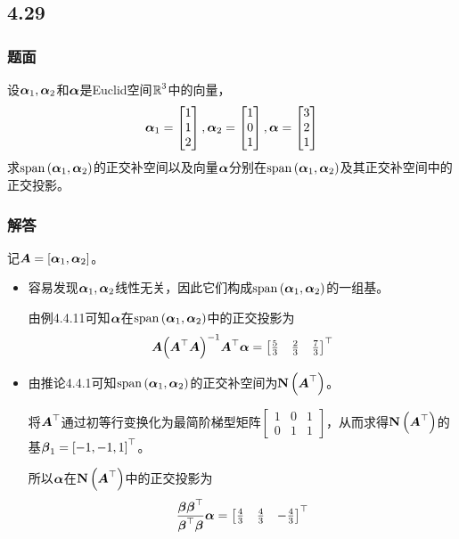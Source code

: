 \documentclass{beamer}
\begin{document}
\subsection*{4.29}
\begin{frame}
    \frametitle{题面}
    设\(\boldsymbol{\alpha}_1,\boldsymbol{\alpha}_2\)和\(\boldsymbol{\alpha}\)是Euclid空间\(\boldsymbol{\mathbb{R}}^3\)中的向量，
    \begin{equation*}
        \boldsymbol{\alpha}_1=\begin{bmatrix}1\\1\\2\end{bmatrix},
        \boldsymbol{\alpha}_2=\begin{bmatrix}1\\0\\1\end{bmatrix},
        \boldsymbol{\alpha}=\begin{bmatrix}3\\2\\1\end{bmatrix}
    \end{equation*}
    求\(\mathrm{span}\left( \boldsymbol{\alpha}_1,\boldsymbol{\alpha}_2 \right)\)的正交补空间以及向量\(\boldsymbol{\alpha}\)分别在\(\mathrm{span}\left( \boldsymbol{\alpha}_1,\boldsymbol{\alpha}_2 \right)\)及其正交补空间中的正交投影。
\end{frame}

\begin{frame}
    \frametitle{解答}
    记\(\boldsymbol{A}=\left[ \boldsymbol{\alpha}_1,\boldsymbol{\alpha}_2 \right]\)。
    \begin{itemize}
        \item {
              容易发现\(\boldsymbol{\alpha}_1,\boldsymbol{\alpha}_2\)线性无关，因此它们构成\(\mathrm{span}\left( \boldsymbol{\alpha}_1,\boldsymbol{\alpha}_2 \right)\)的一组基。

              由例4.4.11可知\(\boldsymbol{\alpha}\)在\(\mathrm{span}\left( \boldsymbol{\alpha}_1,\boldsymbol{\alpha}_2 \right)\)中的正交投影为
              \begin{equation*}
                  \boldsymbol{A}{\left( \boldsymbol{A}^\top\boldsymbol{A} \right)}^{-1}\boldsymbol{A}^\top\boldsymbol{\alpha}=\begin{bmatrix}\frac{5}{3}&\frac{2}{3}&\frac{7}{3}\end{bmatrix}^\top
              \end{equation*}
              }
        \item {
              由推论4.4.1可知\(\mathrm{span}\left( \boldsymbol{\alpha}_1,\boldsymbol{\alpha}_2 \right)\)的正交补空间为\(\boldsymbol{\mathrm{N}}\left( \boldsymbol{A}^\top \right)\)。

              将\(\boldsymbol{A}^\top\)通过初等行变换化为最简阶梯型矩阵\(\begin{bmatrix}1 & 0 & 1 \\0 & 1 & 1\end{bmatrix}\)，从而求得\(\boldsymbol{\mathrm{N}}\left( \boldsymbol{A}^\top \right)\)的基\(\boldsymbol{\beta}_1=\left[ -1,-1,1 \right]^\top\)。

              所以\(\boldsymbol{\alpha}\)在\(\boldsymbol{\mathrm{N}}\left( \boldsymbol{A}^\top \right)\)中的正交投影为
              \begin{equation*}
                  \frac{\boldsymbol{\beta}\boldsymbol{\beta}^\top}{\boldsymbol{\beta}^\top\boldsymbol{\beta}}\boldsymbol{\alpha}=\begin{bmatrix}\frac{4}{3}&\frac{4}{3}&-\frac{4}{3}\end{bmatrix}^\top
              \end{equation*}
              }
    \end{itemize}
\end{frame}
\end{document}
